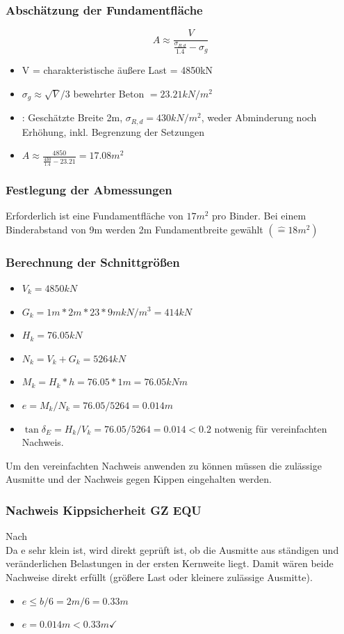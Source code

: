 \documentclass[11pt,fleqn,a4paper,halfparskip]{article}
\begin{document}
\subsubsection*{Abschätzung der Fundamentfläche}
\begin{equation*}
A \approx \frac{V}{\frac{\sigma_{R.d}}{1.4}-\sigma_g}
\end{equation*}
\begin{itemize}
\item[] V = charakteristische äußere Last = 4850kN
\item[] $\sigma_{g} \approx \sqrt{V}/3$ bewehrter Beton $= 23.21kN/m^2$
\item[] \cite[S.111]{wsp}: Geschätzte Breite 2m, $\sigma_{R,d} = 430kN/m^2$, weder Abminderung noch Erhöhung, inkl. Begrenzung der Setzungen
\item[] $A \approx \frac{4850}{\frac{430}{1.4}-23.21} = 17.08m^2$
\end{itemize}
\subsubsection*{Festlegung der Abmessungen}
Erforderlich ist eine Fundamentfläche von $17m^2$ pro Binder. Bei einem Binderabstand von 9m werden 2m Fundamentbreite gewählt $(\widehat{=}18m^2) $
\subsubsection{Berechnung der Schnittgrößen}
\begin{itemize}
\item[] $V_k = 4850kN$
\item[] $G_k = 1m*2m*23*9mkN/m^3 = 414kN$
\item[] $H_k = 76.05kN$
\item[] $N_k = V_k + G_k = 5264kN$
\item[] $M_k = H_k * h = 76.05*1m = 76.05kNm$
\item[] $e = M_k/N_k = 76.05/5264 = 0.014m$
\item[] $\tan\delta_E = H_k/V_k = 76.05/5264 = 0.014 < 0.2$ notwenig für vereinfachten Nachweis.
\end{itemize}
Um den vereinfachten Nachweis anwenden zu können müssen die zulässige Ausmitte und der Nachweis gegen Kippen eingehalten werden.
\subsubsection{Nachweis Kippsicherheit GZ EQU}
Nach \cite[S.97]{wsp}\\
Da e sehr klein ist, wird direkt geprüft ist, ob die Ausmitte aus ständigen und veränderlichen Belastungen in der ersten Kernweite liegt. Damit wären beide Nachweise direkt erfüllt (größere Last oder kleinere zulässige Ausmitte).
\begin{itemize}
\item[] $e \le b/6 = 2m/6 = 0.33m$
\item[] $e = 0.014m < 0.33m \checkmark$
\end{itemize}
\end{document}
